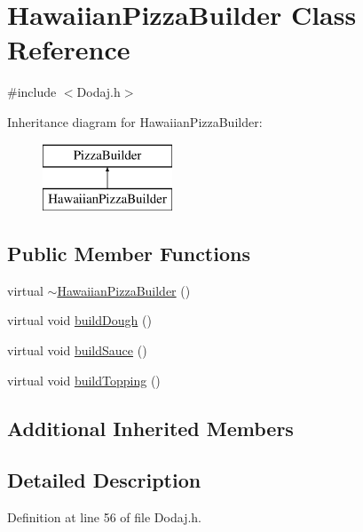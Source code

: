 \hypertarget{class_hawaiian_pizza_builder}{\section{Hawaiian\-Pizza\-Builder Class Reference}
\label{class_hawaiian_pizza_builder}
}


{\ttfamily \#include $<$Dodaj.\-h$>$}

Inheritance diagram for Hawaiian\-Pizza\-Builder\-:\begin{figure}[H]
\begin{center}
\leavevmode
\includegraphics[height=2.000000cm]{class_hawaiian_pizza_builder}
\end{center}
\end{figure}
\subsection*{Public Member Functions}
\begin{DoxyCompactItemize}
\item 
virtual \hyperlink{class_hawaiian_pizza_builder_a621c6b7e508a206a5f85cea4e73fe747}{$\sim$\-Hawaiian\-Pizza\-Builder} ()
\item 
virtual void \hyperlink{class_hawaiian_pizza_builder_a0eddc6f115d76c24a9adfb86dc31a7cc}{build\-Dough} ()
\item 
virtual void \hyperlink{class_hawaiian_pizza_builder_abcfc366ad0ffcec8e93e19807b8eef18}{build\-Sauce} ()
\item 
virtual void \hyperlink{class_hawaiian_pizza_builder_af069af5d54a18d099a6ea6a4382fb42b}{build\-Topping} ()
\end{DoxyCompactItemize}
\subsection*{Additional Inherited Members}


\subsection{Detailed Description}


Definition at line 56 of file Dodaj.\-h.



